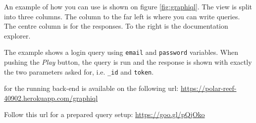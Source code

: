 An example of how you can use  is shown on figure \ref{fig:graphiql}.
The view is split into three columns.
The column to the far left is where you can write queries.
The centre column is for the  responses.
To the right is the documentation explorer.

The example shows a login query using \verb+email+ and \verb+password+ variables.
When pushing the \textit{Play} button, the query is run and the response is shown with exactly the two parameters asked for, i.e. \verb+_id+ and \verb+token+.

 for the running back-end is available on the following \gls{url}: \newline
\url{https://polar-reef-40902.herokuapp.com/graphiql}

Follow this \gls{url} for a prepared query setup: \newline
\url{https://goo.gl/pQjOko}

